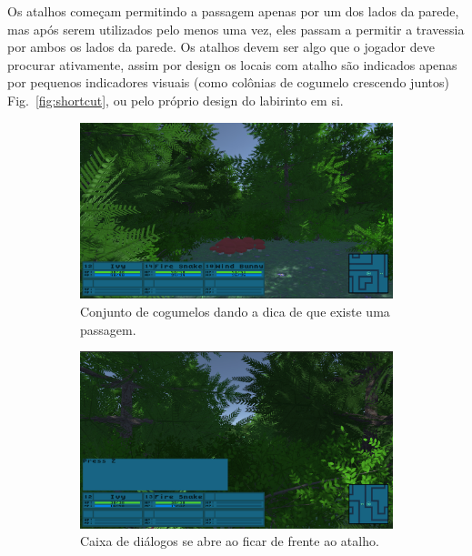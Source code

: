 	Os atalhos começam permitindo a passagem apenas por um dos lados da parede, mas após serem utilizados pelo menos uma vez, eles passam a permitir a travessia por ambos os lados da parede. Os atalhos devem ser algo que o jogador deve procurar ativamente, assim por design os locais com atalho são indicados apenas por pequenos indicadores visuais (como colônias de cogumelo crescendo juntos) Fig.~\ref{fig:shortcut}, ou pelo próprio design do labirinto em si.

\begin{figure}[h!]
  \centering
  \begin{subfigure}[b]{0.47\linewidth}
    \includegraphics[width=\linewidth]{cogumelos.jpg}
     \caption{Conjunto de cogumelos dando a dica de que existe uma passagem.}
  \end{subfigure}
  \begin{subfigure}[b]{0.47\linewidth}
    \includegraphics[width=\linewidth]{prompt.jpg}
    \caption{Caixa de diálogos se abre ao ficar de frente ao atalho.}
  \end{subfigure}
  \begin{subfigure}[b]{0.47\linewidth}

\end{subfigure}
\end{figure}
